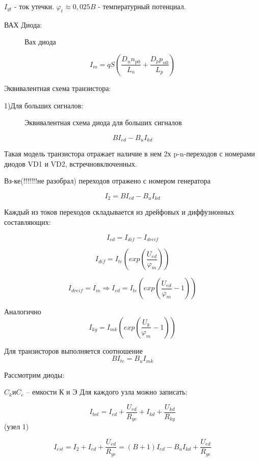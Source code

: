 $I_{yt}$ - ток утечки. $\varphi_t \approx 0,025B$ - температурный потенциал.

ВАХ Диода:
\begin{center}
\begin{figure}[h!]
		\caption{Вах диода}	
		\label{VAX}
	\end{figure}
\end{center}
$$
I_m=qS\left(\frac{D_n n_{p0}}{L_n}+\frac{D_p p_{n0}}{L_p}\right)
$$

Эквивалентная схема транзистора:

1)Для больших сигналов:
\begin{center}
\begin{figure}[h!]
		\caption{Эквивалентная схема диода для больших сигналов}	
		\label{ekvVD1}
	\end{figure}
\end{center}
$$
BI_{ed} - B_uI_{kd}
$$

Такая модель транзистора отражает наличие в нем 2х p-n-переходов с номерами диодов VD1 и VD2, встречновключенных.

Вз-ке(!!!!!!!не разобрал) переходов отражено с номером генератора

$$
I_2 = BI_{ed} - B_uI_{kd}
$$

Каждый из токов переходов складывается из дрейфовых и диффузионных составляющих:

$$
I_{ed} = I_{dif} - I_{dreif}
$$

$$
I_{dif} = I_{te}(exp(\frac{U_{ed}}{\varphi_m}))
$$

$$
I_{dreif}=I_m\Rightarrow I_{ed}=I_{te}(exp(\frac{U_{ed}}{\varphi_m}-1))
$$

Аналогично 
$$
I_{kg}=I_{mk}(exp(\frac{U_k}{\varphi_m}-1))
$$

Для транзисторов выполняется соотношение
$$
BI_{te} = B_uI_{mk}
$$

Рассмотрим диоды:
\begin{center}
\begin{figure}[h!]
		\label{VD}
	\end{figure}
\end{center}
$C_k и C_e$ – емкости К и Э
Для каждого узла можно записать:

$$
I_{bst} = I_{ed} +\frac{U_{ed}}{R_{ye}} + I_{kd} + \frac{U_{kd}}{R_{ky}}
$$ (узел 1)

$$I_{est} = I_2 + I_{ed}  + \frac{U_{ed}}{R_{ye}}=(B+1)I_{ed} - B_u I_{kd} + \frac{U_{ed}}{R_{ye}}$$


